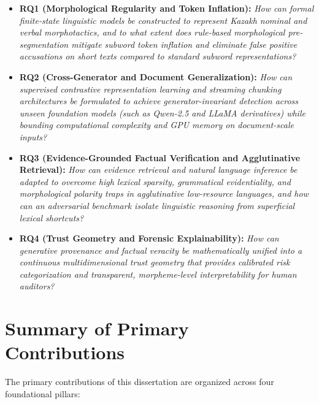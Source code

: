 \begin{itemize}
    \item \textbf{RQ1 (Morphological Regularity and Token Inflation):} \textit{How can formal finite-state linguistic models be constructed to represent Kazakh nominal and verbal morphotactics, and to what extent does rule-based morphological pre-segmentation mitigate subword token inflation and eliminate false positive accusations on short texts compared to standard subword representations?}
    \item \textbf{RQ2 (Cross-Generator and Document Generalization):} \textit{How can supervised contrastive representation learning and streaming chunking architectures be formulated to achieve generator-invariant detection across unseen foundation models (such as Qwen-2.5 and LLaMA derivatives) while bounding computational complexity and GPU memory on document-scale inputs?}
    \item \textbf{RQ3 (Evidence-Grounded Factual Verification and Agglutinative Retrieval):} \textit{How can evidence retrieval and natural language inference be adapted to overcome high lexical sparsity, grammatical evidentiality, and morphological polarity traps in agglutinative low-resource languages, and how can an adversarial benchmark isolate linguistic reasoning from superficial lexical shortcuts?}
    \item \textbf{RQ4 (Trust Geometry and Forensic Explainability):} \textit{How can generative provenance and factual veracity be mathematically unified into a continuous multidimensional trust geometry that provides calibrated risk categorization and transparent, morpheme-level interpretability for human auditors?}
\end{itemize}

\section{Summary of Primary Contributions}
\label{sec:intro_contributions}

The primary contributions of this dissertation are organized across four foundational pillars:

